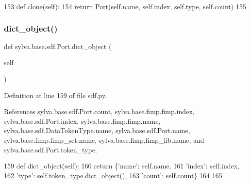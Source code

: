 \begin{DoxyCode}
153     \textcolor{keyword}{def }clone(self):
154         \textcolor{keywordflow}{return} Port(self.name, self.index, self.type, self.count)
155 
\end{DoxyCode}
\mbox{\label{classsylva_1_1base_1_1sdf_1_1_port_a15a6d8d321b101e2247cad4cd14d5623}} 
\subsubsection{\texorpdfstring{dict\+\_\+object()}{dict\_object()}}
{\footnotesize\ttfamily def sylva.\+base.\+sdf.\+Port.\+dict\+\_\+object (\begin{DoxyParamCaption}\item[{}]{self }\end{DoxyParamCaption})}







Definition at line 159 of file sdf.\+py.



References sylva.\+base.\+sdf.\+Port.\+count, sylva.\+base.\+fimp.\+fimp.\+index, sylva.\+base.\+sdf.\+Port.\+index, sylva.\+base.\+fimp.\+fimp.\+name, sylva.\+base.\+sdf.\+Data\+Token\+Type.\+name, sylva.\+base.\+sdf.\+Port.\+name, sylva.\+base.\+fimp.\+fimp\+\_\+set.\+name, sylva.\+base.\+fimp.\+fimp\+\_\+lib.\+name, and sylva.\+base.\+sdf.\+Port.\+token\+\_\+type.


\begin{DoxyCode}
159     \textcolor{keyword}{def }dict\_object(self):
160         \textcolor{keywordflow}{return} \{\textcolor{stringliteral}{'name'}: self.name,
161                 \textcolor{stringliteral}{'index'}: self.index,
162                 \textcolor{stringliteral}{'type'}: self.token\_type.dict\_object(),
163                 \textcolor{stringliteral}{'count'}: self.count\}
164 
165 
\end{DoxyCode}
\mbox{\label{classsylva_1_1base_1_1sylva__base_1_1_s_y_l_v_a_base_a4acd68307f4b2bef6082b86f3ff6ce3a}} 
